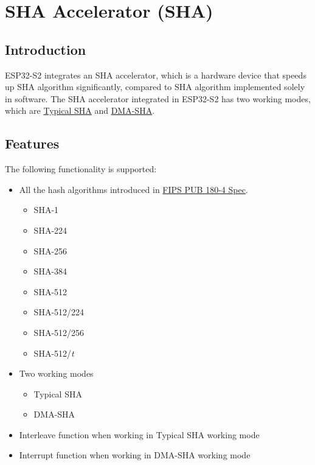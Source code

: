 \documentclass[main\_\_EN.tex]{subfiles}
\begin{document}
\setenglishformatting

\ifglobal
\else
    \listoftodos
    {\let\clearpage\relax \listofdonetodos}
    \tableofcontents
\fi




\hypertarget{sha}{}
\chapter{SHA Accelerator (SHA)}
\label{mod:sha}

\section{Introduction}

ESP32-S2 integrates an SHA accelerator, which is a hardware device that speeds up SHA algorithm significantly, compared to SHA algorithm implemented solely in software. The SHA accelerator integrated in ESP32-S2 has two working modes, which are  \hyperref[subsection:typicalsha]{Typical SHA} and  \hyperref[subsection:dma-sha]{DMA-SHA}.

\section{Features}

The following functionality is supported:

\begin{itemize}
    \item All the hash algorithms introduced in   \href{https://doi.org/10.6028/NIST.FIPS.180-4}{FIPS PUB 180-4 Spec}.
    \begin{itemize}
        \item SHA-1
        \item SHA-224
        \item SHA-256
        \item SHA-384
        \item SHA-512
        \item SHA-512/224
        \item SHA-512/256
        \item SHA-512/{\it{t}}
    \end{itemize}
    \item Two working modes
    \begin{itemize}
        \item Typical SHA
        \item DMA-SHA
    \end{itemize}
    \item Interleave function when working in Typical SHA working mode
    \item Interrupt function when working in DMA-SHA working mode
\end{itemize}
\end{document}
